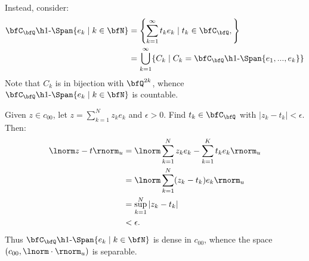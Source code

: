 \begin{example}
\begin{enumerate}[label = (\arabic*),itemsep=1pt,topsep=3pt]
            Instead, consider:
                \begin{equation*}
                \begin{split}
                    \bfC_\bfQ\text{\h1-}\Span\{e_k \mid k \in \bfN \}
                    & = \left\{ \sum_{k = 1}^\infty t_k e_k \mid t_k \in \bfC_\bfQ,  \right\} \\
                    & = \bigcup_{k = 1}^\infty \{C_k \mid C_k = \bfC_\bfQ\text{\h1-}\Span\{e_1,...,e_k\}\}
                \end{split}
                \end{equation*}
            Note that $C_k$ is in bijection with $\bfQ^{2k}$, whence $\bfC_\bfQ\text{\h1-}\Span\{e_k \mid k \in \bfN \}$ is countable.

            Given $z \in c_{00}$, let $z = \sum_{k = 1}^N z_k e_k$ and $\epsilon > 0$. Find $t_k \in \bfC_\bfQ$ with $|z_k - t_k| < \epsilon$. Then:
                \begin{equation*}
                \begin{split}
                    \lnorm z - t \rnorm_u 
                    & = \lnorm \sum_{k = 1}^N z_k e_k - \sum_{k = 1}^K t_k e_k \rnorm_u \\
                    & = \lnorm \sum_{k = 1}^N (z_k - t_k)e_k \rnorm_u \\
                    & = \sup_{k = 1}^N |z_k - t_k| \\
                    & < \epsilon.
                \end{split}
                \end{equation*}
            Thus $\bfC_\bfQ\text{\h1-}\Span\{e_k \mid k \in \bfN \}$ is dense in $c_{00}$, whence the space $(c_{00},\lnorm \cdot \rnorm_u)$ is separable.
        \end{enumerate}
    \end{example}

